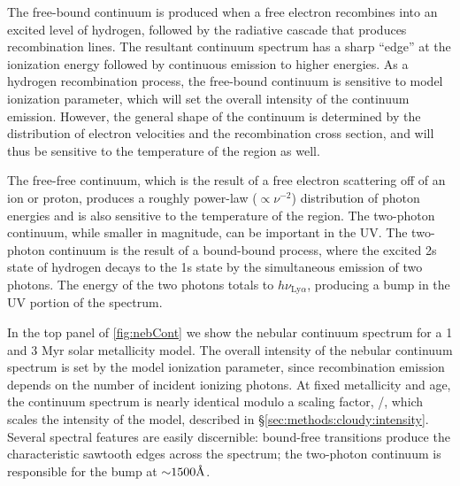 The free-bound continuum is produced when a free electron recombines into an excited level of hydrogen, followed by the radiative cascade that produces recombination lines. The resultant continuum spectrum has a sharp ``edge'' at the ionization energy followed by continuous emission to higher energies. As a hydrogen recombination process, the free-bound continuum is sensitive to model ionization parameter, which will set the overall intensity of the continuum emission. However, the general shape of the continuum is determined by the distribution of electron velocities and the recombination cross section, and will thus be sensitive to the temperature of the \hii region as well.

The free-free continuum, which is the result of a free electron scattering off of an ion or proton, produces a roughly power-law ($\propto \nu^{-2}$) distribution of photon energies and is also sensitive to the temperature of the \hii region. The two-photon continuum, while smaller in magnitude, can be important in the UV. The two-photon continuum is the result of a bound-bound process, where the excited 2s state of hydrogen decays to the 1s state by the simultaneous emission of two photons. The energy of the two photons totals to $h\nu_{\mathrm{Ly}\alpha}$, producing a bump in the UV portion of the spectrum.

In the top panel of \ref{fig:nebCont} we show the nebular continuum spectrum for a 1 and 3 Myr solar metallicity model. The overall intensity of the nebular continuum spectrum is set by the model ionization parameter, since recombination emission depends on the number of incident ionizing photons. At fixed metallicity and age, the continuum spectrum is nearly identical modulo a scaling factor, \QHat{}/\QH{}, which scales the intensity of the model, described in \S\ref{sec:methods:cloudy:intensity}. Several spectral features are easily discernible: bound-free transitions produce the characteristic sawtooth edges across the spectrum; the two-photon continuum is responsible for the bump at ${\sim}1500 \mbox{\AA}$.

